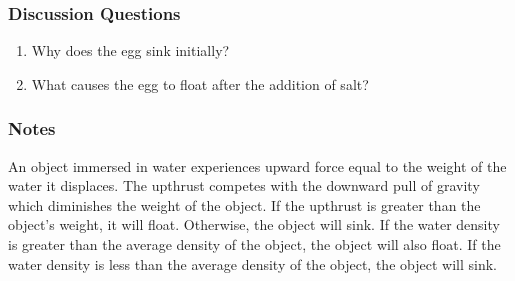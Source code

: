 \subsubsection*{Discussion Questions}
\begin{enumerate}
\item{Why does the egg sink initially?}
\item{What causes the egg to float after the addition of salt?}
\end{enumerate}

\subsubsection*{Notes}
An object immersed in water experiences upward force equal to the weight of the water it displaces. The upthrust competes with the downward pull of gravity which diminishes the weight of the object. If the upthrust is greater than the object's weight, it will float. Otherwise, the object will sink. If the water density is greater than the average density of the object, the object will also float. If the water density is less than the average density of the object, the object will sink.  
